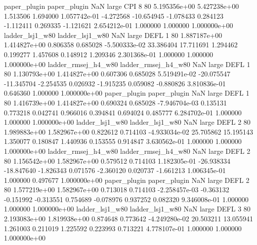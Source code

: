        paper_plugin        paper_plugin                   NaN      large      CPI                 8 80 5.195356e+00   5.427238e+00      1.513506       1.694000  1.057742e-01     -4.272568    -10.654945    -1.078433       0.284123 -1.112411   0.269335    -1.121621   2.654212e-01            1.000000        1.000000        1.000000e+00
    ladder_lsj1_w80     ladder_lsj1_w80                   NaN      large     DEFL                 1 80 1.887187e+00   1.414827e+00      0.806358       0.685028 -5.500333e-02     33.386404     17.711691     1.294462       0.199277  1.457608   0.148912     1.209346   2.301368e-01            1.000000        1.000000        1.000000e+00
ladder_rmsej_h4_w80 ladder_rmsej_h4_w80                   NaN      large     DEFL                 1 80 1.130793e+00   1.414827e+00      0.607306       0.685028  5.519491e-02    -20.075547    -11.345704    -2.254535       0.026932 -1.915235   0.059082    -0.880826   3.810836e-01            0.646360        1.000000        1.000000e+00
       paper_plugin        paper_plugin                   NaN      large     DEFL                 1 80 1.416739e+00   1.414827e+00      0.690324       0.685028 -7.946704e-03      0.135131      0.773218     0.042741       0.966016  0.394841   0.694024     0.485777   6.284702e-01            1.000000        1.000000        1.000000e+00
    ladder_lsj1_w80     ladder_lsj1_w80                   NaN      large     DEFL                 2 80 1.989883e+00   1.582967e+00      0.822612       0.714103 -4.933034e-02     25.705862     15.195143     1.350077       0.180847  1.440936   0.153555     0.914847   3.630562e-01            1.000000        1.000000        1.000000e+00
ladder_rmsej_h4_w80 ladder_rmsej_h4_w80                   NaN      large     DEFL                 2 80 1.156542e+00   1.582967e+00      0.579512       0.714103  1.182305e-01    -26.938334    -18.847640    -1.826343       0.071576 -2.360120   0.020737    -1.661213   1.006345e-01            1.000000        0.497677        1.000000e+00
       paper_plugin        paper_plugin                   NaN      large     DEFL                 2 80 1.577219e+00   1.582967e+00      0.713018       0.714103 -2.258457e-03     -0.363132     -0.151992    -0.313551       0.754689 -0.078976   0.937252     0.082320   9.346008e-01            1.000000        1.000000        1.000000e+00
    ladder_lsj1_w80     ladder_lsj1_w80                   NaN      large     DEFL                 3 80 2.193083e+00   1.819938e+00      0.874648       0.773642 -4.249280e-02     20.503211     13.055941     1.261003       0.211019  1.225592   0.223993     0.713221   4.778107e-01            1.000000        1.000000        1.000000e+00
